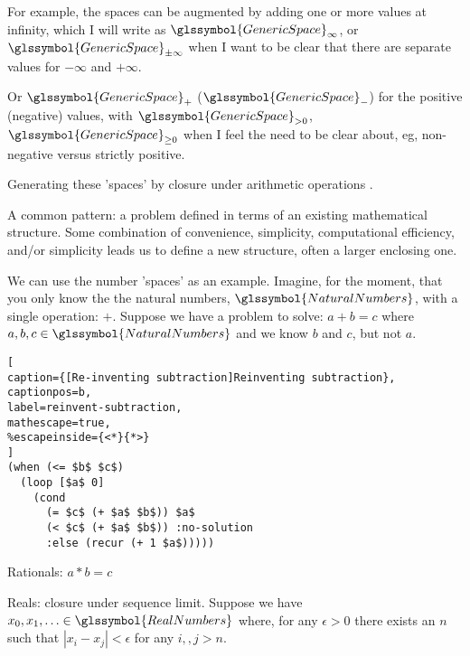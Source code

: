 For example, the spaces can be 
augmented by adding one or more values at infinity, which I will
write as $\glssymbol{GenericSpace}_{\infty}$,
or $\glssymbol{GenericSpace}_{\pm\infty}$ when I want to be 
clear that there are separate values for $-\infty$ and $+\infty$.

Or $\glssymbol{GenericSpace}_{+}$ ($\glssymbol{GenericSpace}_{-}$)
for the positive (negative) values, with 
$\glssymbol{GenericSpace}_{> 0}$, $\glssymbol{GenericSpace}_{\geq 0}$ 
when I feel the need to be clear about, eg, non-negative versus
strictly positive.


Generating these 'spaces' by closure under arithmetic operations
\cite{pickert-gorke-real-numbers-1974}.

A common pattern: a problem defined in terms of an existing mathematical
structure. Some combination of convenience, simplicity, computational
efficiency, and/or simplicity leads us to define a new structure, 
often a larger enclosing one.

We can use the number 'spaces' as an example.
Imagine, for the moment, that you only know the 
the natural numbers, $\glssymbol{NaturalNumbers}$, with a single operation: $+$.
Suppose we have a problem to solve:
\begin{math}
a + b = c
\end{math}
where $a,b,c\in \glssymbol{NaturalNumbers}$ and we know $b$ and $c$,
but not $a$.

\begin{lstlisting}[
caption={[Re-inventing subtraction]Reinventing subtraction},
captionpos=b,
label=reinvent-subtraction,
mathescape=true,
%escapeinside={<*}{*>}
] 
(when (<= $b$ $c$)
  (loop [$a$ 0]
    (cond 
      (= $c$ (+ $a$ $b$)) $a$
      (< $c$ (+ $a$ $b$)) :no-solution
      :else (recur (+ 1 $a$)))))
\end{lstlisting}

Rationals: 
\begin{math}
a * b = c
\end{math}

Reals: closure under sequence limit.
Suppose we have $x_0, x_1, \ldots \in \glssymbol{RealNumbers}$
where, for any $\epsilon>0$ there exists an $n$ such that
$|x_i - x_j| < \epsilon$ for any $i,, j > n$.

